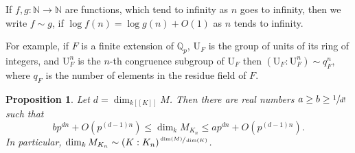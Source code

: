 \documentclass[11pt]{article}
\newtheorem{prop}{Proposition}[section]
\theoremstyle{definition}
\newcommand{\br}[1]{[\![#1]\!]}
\newcommand{\Qp}{\mathbb {Q}_p}
\newcommand{\UU}{\mathrm U}
\begin{document}
If $f, g:\mathbb N\to \mathbb N$ are functions, which tend to infinity as $n$ goes to infinity, then we write $f\sim g$, if $\log f(n)=\log g(n) + O(1)$ as $n$ tends to infinity.

For example,
if $F$ is a finite extension of $\Qp$, $\UU_F$ is the group of units of its ring of integers, and $\UU_F^n$ is the $n$-th congruence subgroup of $\UU_F$ then
$(\UU_F: \UU_F^n)\sim q_F^n$, where $q_F$ is the number of elements in the residue field of $F$.
\begin{prop}\label{growth} Let $d=\dim_{k\br{K}} M$. Then there are real numbers $a\ge b\ge \sfrac{1}{d!}$ such that
\[
bp^{dn} + O(p^{(d-1)n})\le \dim_k M_{K_n}\le ap^{dn} + O(p^{(d-1)n}).
\]
In particular,
$\dim_k M_{K_n}\sim (K: K_n)^{\sfrac{\dim(M)} {\dim (K)}}$.
\end{prop}
\end{document}
